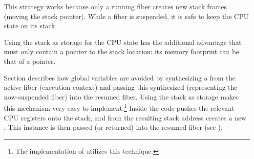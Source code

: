 This strategy works because only a running fiber creates new stack frames
(moving the stack pointer). While a fiber is suspended, it is safe to keep the
CPU state on its stack.

Using the stack as storage for the CPU state has the additional advantage that
\fiber must only contain a pointer to the stack location: its memory footprint
can be that of a pointer.

Section  describes how global variables are avoided
by synthesizing a \fiber from the active fiber (execution context) and passing
this synthesized \fiber (representing the now-suspended fiber) into the resumed
fiber. Using the stack as storage makes this mechanism very easy to
implement.\footnote{The implementation of \bcontext\cite{bcontext} utilizes this
technique.}
Inside \resume the code pushes the relevant CPU registers onto the stack, and
from the resulting stack address creates a new \fiber. This instance is then
passed (or returned) into the resumed fiber (see ).


